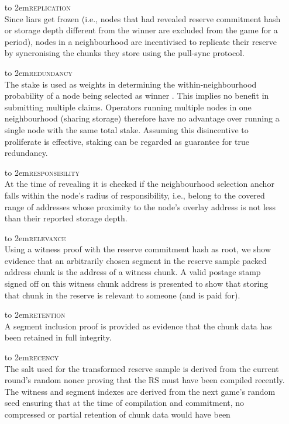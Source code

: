 \begin{itemize}[noitemsep]
%
\item[\hbox to 2em{\textsc{replication}}] \hspace{1cm}\\ Since liars get frozen (i.e., nodes that had revealed reserve commitment hash or storage depth different  from the winner are excluded from the game for a period), nodes in a neighbourhood are incentivised to replicate their reserve by syncronising the chunks they store using the pull-sync protocol.
%
\item[\hbox to 2em{\textsc{redundancy}}] \hspace{1cm}\\ The stake is used as weights in determining the within-neighbourhood probability of a node being selected as winner%
. This implies no benefit in submitting multiple claims. Operators running multiple nodes in one neighbourhood (sharing storage) therefore have no advantage over running a single node with the same total stake. Assuming this disincentive to proliferate is effective, staking can be regarded as guarantee for true redundancy.
%
\item[\hbox to 2em{\textsc{responsibility}}] \hspace{1cm}\\  At the time of revealing it is checked if the neighbourhood selection anchor falls within the node's radius of responsibility, i.e., belong to the covered range of addresses whose proximity to the node's overlay address is not less than their reported storage depth. 
%
\item[\hbox to 2em{\textsc{relevance}}] \hspace{1cm}\\ Using a witness proof with the reserve commitment hash as root, we show evidence that an arbitrarily chosen segment in the reserve sample packed address chunk is the address of a witness chunk. 
A valid postage stamp signed off on this witness chunk address is presented to show that storing that chunk  in the reserve is relevant to someone (and is paid for). 
\item[\hbox to 2em{\textsc{retention}}] \hspace{1cm}\\ A segment inclusion proof is provided as evidence that the chunk data has been retained in full integrity. 
\item[\hbox to 2em{\textsc{recency}}] \hspace{1cm}\\ The salt used for the transformed reserve sample is derived from the current round's random nonce proving that the RS must have been compiled recently. The witness and segment indexes are derived from the next game's random seed ensuring that at the time of compilation and commitment, no compressed or partial retention of chunk data would have been

\end{itemize}

